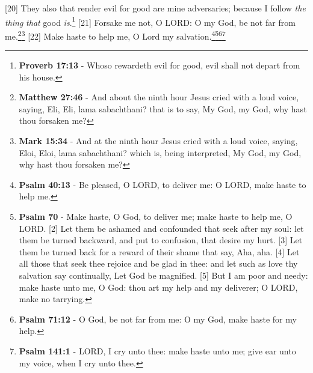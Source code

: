 [20] \textcolor[cmyk]{0.99998,1,0,0}{They also that render evil for good are mine adversaries; because I follow \emph{the} \emph{thing} \emph{that} good \emph{is}.}\footnote{\textbf{Proverb 17:13} - Whoso rewardeth evil for good, evil shall not depart from his house.} %
[21] \textcolor[cmyk]{0.99998,1,0,0}{Forsake me not, O LORD: O my God, be not far from me.}\footnote{\textbf{Matthew 27:46} - And about the ninth hour Jesus cried with a loud voice, saying, Eli, Eli, lama sabachthani?  that is to say, My God, my God, why hast thou forsaken me?}\footnote{\textbf{Mark 15:34} - And at the ninth hour Jesus cried with a loud voice, saying, Eloi, Eloi, lama sabachthani? which is, being interpreted, My God, my God, why hast thou forsaken me?}
[22] \textcolor[cmyk]{0.99998,1,0,0}{Make haste to help me, O Lord my salvation.}\footnote{\textbf{Psalm 40:13} - Be pleased, O LORD, to deliver me: O LORD, make haste to help me.}\footnote{\textbf{Psalm 70} - Make haste, O God, to deliver me; make haste to help me, O LORD. [2] Let them be ashamed and confounded that seek after my soul: let them be turned backward, and put to confusion, that desire my hurt. [3] Let them be turned back for a reward of their shame that say, Aha, aha. [4] Let all those that seek thee rejoice and be glad in thee: and let such as love thy salvation say continually, Let God be magnified. [5] But I am poor and needy: make haste unto me, O God: thou art my help and my deliverer; O LORD, make no tarrying.}\footnote{\textbf{Psalm 71:12} - O God, be not far from me: O my God, make haste for my help.}\footnote{\textbf{Psalm 141:1} - LORD, I cry unto thee: make haste unto me; give ear unto my voice, when I cry unto thee.}






